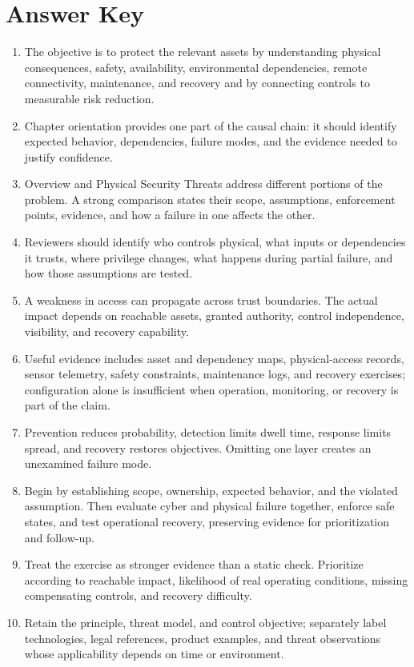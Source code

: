 \documentclass[11pt]{article}
\begin{document}
\section*{Answer Key}
\begin{enumerate}
\item The objective is to protect the relevant assets by understanding physical consequences, safety, availability, environmental dependencies, remote connectivity, maintenance, and recovery and by connecting controls to measurable risk reduction.
\item Chapter orientation provides one part of the causal chain: it should identify expected behavior, dependencies, failure modes, and the evidence needed to justify confidence.
\item Overview and Physical Security Threats address different portions of the problem. A strong comparison states their scope, assumptions, enforcement points, evidence, and how a failure in one affects the other.
\item Reviewers should identify who controls physical, what inputs or dependencies it trusts, where privilege changes, what happens during partial failure, and how those assumptions are tested.
\item A weakness in access can propagate across trust boundaries. The actual impact depends on reachable assets, granted authority, control independence, visibility, and recovery capability.
\item Useful evidence includes asset and dependency maps, physical-access records, sensor telemetry, safety constraints, maintenance logs, and recovery exercises; configuration alone is insufficient when operation, monitoring, or recovery is part of the claim.
\item Prevention reduces probability, detection limits dwell time, response limits spread, and recovery restores objectives. Omitting one layer creates an unexamined failure mode.
\item Begin by establishing scope, ownership, expected behavior, and the violated assumption. Then evaluate cyber and physical failure together, enforce safe states, and test operational recovery, preserving evidence for prioritization and follow-up.
\item Treat the exercise as stronger evidence than a static check. Prioritize according to reachable impact, likelihood of real operating conditions, missing compensating controls, and recovery difficulty.
\item Retain the principle, threat model, and control objective; separately label technologies, legal references, product examples, and threat observations whose applicability depends on time or environment.
\end{enumerate}
\end{document}
